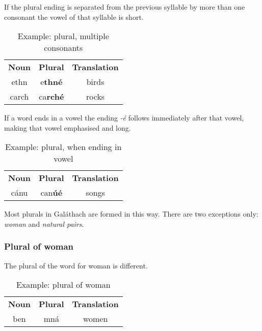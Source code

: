If the plural ending is separated from the previous syllable by more than one consonant the vowel of that syllable is short.
\begin{table}[H]
\centering
\begin{tabular}{ccc}
  \toprule
  \textbf{Noun} & \textbf{Plural} & \textbf{Translation}\\
  \cmidrule(lr){1-1}\cmidrule(lr){2-2}\cmidrule(lr){3-3}
  ethn & e\textbf{thn\'{e}} & birds\\
  carch & ca\textbf{rch\'{e}} & rocks\\
  \bottomrule
\end{tabular}
\caption{Example: plural, multiple consonants}
\label{example_plural_multiple_consonants}
\end{table}

If a word ends in a vowel the ending \textit{-\'{e}} follows immediately after that vowel, making that vowel emphasised and long.
\begin{table}[H]
\centering
\begin{tabular}{ccc}
  \toprule
  \textbf{Noun} & \textbf{Plural} & \textbf{Translation}\\
  \cmidrule(lr){1-1}\cmidrule(lr){2-2}\cmidrule(lr){3-3}
  c\'{a}nu & can\textbf{\'{u}\'{e}} & songs\\
  \bottomrule
\end{tabular}
\caption{Example: plural, when ending in vowel}
\label{example_plural_ends_in_vowel}
\end{table}

Most plurals in Gal\'{a}thach are formed in this way. There are two exceptions only: \textit{woman} and \textit{natural pairs}.

\subsubsection{Plural of woman}

The plural of the word for woman is different.
\begin{table}[H]
\centering
\begin{tabular}{ccc}
  \toprule
  \textbf{Noun} & \textbf{Plural} & \textbf{Translation}\\
  \cmidrule(lr){1-1}\cmidrule(lr){2-2}\cmidrule(lr){3-3}
  ben & mn\'{a} & women\\
  \bottomrule
\end{tabular}
\caption{Example: plural of woman}
\label{example_plural_of_woman}
\end{table}

